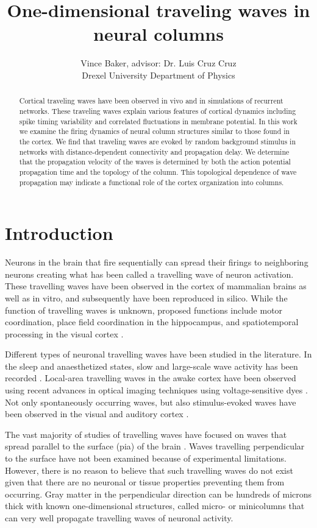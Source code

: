 \documentclass[a4paper,11pt]{article}
\title{One-dimensional traveling waves in neural columns}
\author{Vince Baker, advisor: Dr. Luis Cruz Cruz\\ Drexel University Department of Physics}
\begin{document}
\maketitle

\begin{abstract}
Cortical traveling waves have been observed in vivo and in simulations of recurrent networks.
These traveling waves explain various features of cortical dynamics including spike timing variability and correlated fluctuations in membrane potential.
In this work we examine the firing dynamics of neural column structures similar to those found in the cortex.
We find that traveling waves are evoked by random background stimulus in networks with distance-dependent connectivity and propagation delay.
We determine that the propagation velocity of the waves is determined by both the action potential propagation time and the topology of the column.
This topological dependence of wave propagation may indicate a functional role of the cortex organization into columns.

\end{abstract}

\section{Introduction} 
Neurons in the brain that fire sequentially can spread their firings to neighboring neurons creating what has been called a travelling wave of neuron activation. 
These travelling waves have been observed in the cortex of mammalian brains as well as in vitro, and subsequently have been reproduced in silico. 
While the function of travelling waves is unknown, proposed functions include motor coordination, place field coordination in the hippocampus, and spatiotemporal processing in the visual cortex \cite{muller2018}. 

Different types of neuronal travelling waves have been studied in the literature. 
In the sleep and anaesthetized states, slow and large-scale wave activity has been recorded \cite{muller2018}. 
Local-area travelling waves in the awake cortex have been observed using recent advances in optical imaging techniques using voltage-sensitive dyes \cite{wu2008}. 
Not only spontaneously occurring waves, but also stimulus-evoked waves have been observed in the visual and auditory cortex \cite{reimer2010}\cite{muller2018}.

The vast majority of studies of travelling waves have focused on waves that spread parallel to the surface (pia) of the brain \cite{muller2018}. 
Waves travelling perpendicular to the surface have not been examined because of experimental limitations. 
However, there is no reason to believe that such travelling waves do not exist given that there are no neuronal or tissue properties preventing them from occurring. 
Gray matter in the perpendicular direction can be hundreds of microns thick with known one-dimensional structures, called micro- or minicolumns\cite{cruz2000} that can very well propagate travelling waves of neuronal activity.
\end{document}
